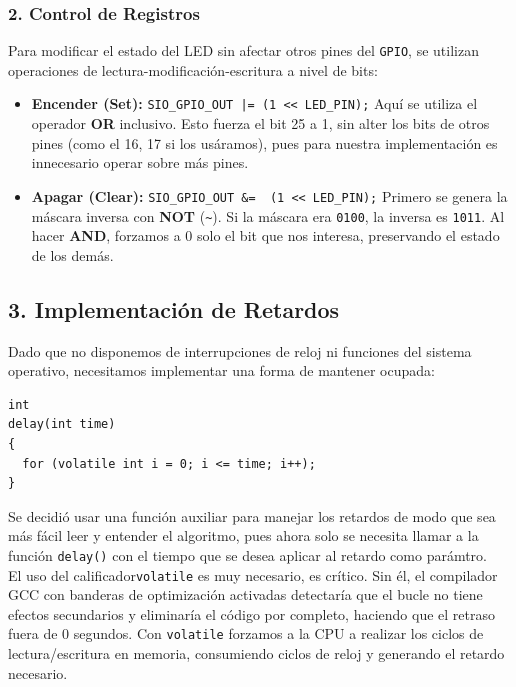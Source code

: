 \documentclass[12pt,letterpaper]{article}
\begin{document}
\subsubsection*{2. Control de Registros}

Para modificar el estado del LED sin afectar otros pines del \texttt{GPIO}, se utilizan operaciones de lectura-modificación-escritura a nivel de bits:
\begin{itemize}
\item \textbf{Encender (Set):} \texttt{SIO\_GPIO\_OUT |= (1 << LED\_PIN);}
  Aquí se utiliza el operador \textbf{OR} inclusivo. Esto fuerza el bit 25 a 1, sin alter los bits de otros pines (como el 16, 17 si los usáramos), pues para nuestra implementación es innecesario operar sobre más pines.
\item \textbf{Apagar (Clear):} \texttt{SIO\_GPIO\_OUT \&= ~(1 << LED\_PIN);}
  Primero se genera la máscara inversa con \textbf{NOT} (\texttt{\~}). Si la máscara era \texttt{0100}, la inversa es \texttt{1011}. Al hacer \textbf{AND}, forzamos a 0 solo el bit que nos interesa, preservando el estado de los demás.
\end{itemize}

\subsection*{3. Implementación de Retardos}

Dado que no disponemos de interrupciones de reloj ni funciones del sistema operativo, necesitamos implementar una forma de mantener ocupada:
\begin{verbatim}
int
delay(int time)
{
  for (volatile int i = 0; i <= time; i++);
}
\end{verbatim}

\noindent
Se decidió usar una función auxiliar para manejar los retardos de modo que sea más fácil leer y entender el algoritmo, pues ahora solo se necesita llamar a la función \texttt{delay()} con el tiempo que se desea aplicar al retardo como parámtro.\\

\noindent
El uso del calificador\texttt{volatile} es muy necesario, es crítico. Sin él, el compilador GCC con banderas de optimización activadas detectaría que el bucle no tiene efectos secundarios y eliminaría el código por completo, haciendo que el retraso fuera de 0 segundos. Con \texttt{volatile} forzamos a la CPU a realizar los ciclos de lectura/escritura en memoria, consumiendo ciclos de reloj y generando el retardo necesario.
\end{document}
